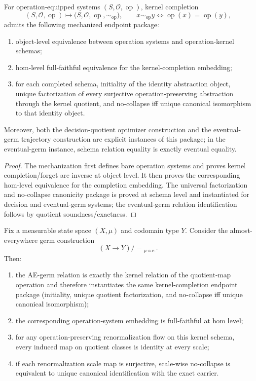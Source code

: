 \begin{theorem}\label{thm:kernel-completion-categorical-endpoint}
For operation-equipped systems $(S,\mathcal O,\operatorname{op})$, kernel completion
\[
(S,\mathcal O,\operatorname{op})\mapsto
\bigl(S,\mathcal O,\operatorname{op},\sim_{\operatorname{op}}\bigr),
\qquad
x\sim_{\operatorname{op}}y\iff \operatorname{op}(x)=\operatorname{op}(y),
\]
admits the following mechanized endpoint package:
\begin{enumerate}
\item object-level equivalence between operation systems and operation-kernel schemas;
\item hom-level full-faithful equivalence for the kernel-completion embedding;
\item for each completed schema, initiality of the identity abstraction object, unique factorization of every surjective operation-preserving abstraction through the kernel quotient, and no-collapse iff unique canonical isomorphism to that identity object.
\end{enumerate}
Moreover, both the decision-quotient optimizer construction and the eventual-germ trajectory construction are explicit instances of this package; in the eventual-germ instance, schema relation equality is exactly eventual equality.
\end{theorem}

\begin{proof}
The mechanization first defines bare operation systems and proves kernel completion/forget are inverse at object level. It then proves the corresponding hom-level equivalence for the completion embedding. The universal factorization and no-collapse canonicity package is proved at schema level and instantiated for decision and eventual-germ systems; the eventual-germ relation identification follows by quotient soundness/exactness.
\end{proof}

\begin{theorem}\label{thm:ae-rg-kernel-endpoint}
Fix a measurable state space $(X,\mu)$ and codomain type $Y$. Consider the almost-everywhere germ construction
\[
(X\to Y)/{=\!_{\mu\text{-a.e.}}}.
\]
Then:
\begin{enumerate}
\item the AE-germ relation is exactly the kernel relation of the quotient-map operation and therefore instantiates the same kernel-completion endpoint package (initiality, unique quotient factorization, and no-collapse iff unique canonical isomorphism);
\item the corresponding operation-system embedding is full-faithful at hom level;
\item for any operation-preserving renormalization flow on this kernel schema, every induced map on quotient classes is identity at every scale;
\item if each renormalization scale map is surjective, scale-wise no-collapse is equivalent to unique canonical identification with the exact carrier.
\end{enumerate}
\end{theorem}

